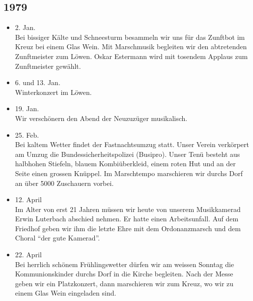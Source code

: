 \subsection*{1979}

\begin{history}


    \begin{itemize}

        \item 2. Jan.\\
              Bei bissiger Kälte und Schneesturm besammeln wir uns für das Zunftbot im
              Kreuz bei einem Glas Wein. Mit Marschmusik begleiten wir den abtretenden
              Zunftmeister zum Löwen. Oskar Estermann wird mit tosendem Applaus zum
              Zunftmeister gewählt.

        \item 6. und 13. Jan.\\
              Winterkonzert im Löwen.

        \item 19. Jan.\\
              Wir verschönern den Abend der Neuzuzüger musikalisch.

        \item 25. Feb.\\
              Bei kaltem Wetter findet der Fastnachtsumzug statt. Unser Verein
              verkörpert am Umzug die Bundessicherheitspolizei (Busipro). Unser Tenü
              besteht aus halbhohen Stiefeln, blauem Kombiüberkleid, einem roten Hut
              und an der Seite einen grossen Knüppel. Im Marschtempo marschieren wir
              durchs Dorf an über 5000 Zuschauern vorbei.

        \item 12. April\\
              Im Alter von erst 21 Jahren müssen wir heute von unserem Musikkamerad
              Erwin Luterbach abschied nehmen. Er hatte einen Arbeitsunfall. Auf dem
              Friedhof geben wir ihm die letzte Ehre mit dem Ordonanzmarsch und dem
              Choral \enquote{der gute Kamerad}.

        \item 22. April\\
              Bei herrlich schönem Frühlingswetter dürfen wir am weissen Sonntag die
              Kommunionskinder durchs Dorf in die Kirche begleiten. Nach der Messe
              geben wir ein Platzkonzert, dann marschieren wir zum Kreuz, wo wir zu
              einem Glas Wein eingeladen sind.


\end{itemize}
\end{history}
